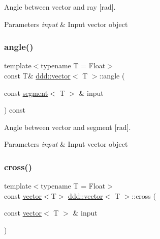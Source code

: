 Angle between vector and ray \mbox{[}rad\mbox{]}. 


\begin{DoxyParams}{Parameters}
{\em input} & Input vector object \\
\hline
\end{DoxyParams}
\mbox{\label{classddd_1_1vector_aa1d50d563f55d5795d565ed70ec5b845}} 
\subsubsection{\texorpdfstring{angle()}{angle()}\hspace{0.1cm}{\footnotesize\ttfamily [4/4]}}
{\footnotesize\ttfamily template$<$typename T = Float$>$ \\
const T\& \hyperlink{classddd_1_1vector}{ddd\+::vector}$<$ T $>$\+::angle (\begin{DoxyParamCaption}\item[{const \hyperlink{classddd_1_1segment}{segment}$<$ T $>$ \&}]{input }\end{DoxyParamCaption}) const\hspace{0.3cm}{\ttfamily [inline]}}



Angle between vector and segment \mbox{[}rad\mbox{]}. 


\begin{DoxyParams}{Parameters}
{\em input} & Input vector object \\
\hline
\end{DoxyParams}
\mbox{\label{classddd_1_1vector_a27ac4cb7a469642d497cfe070935ab4b}} 
\subsubsection{\texorpdfstring{cross()}{cross()}}
{\footnotesize\ttfamily template$<$typename T = Float$>$ \\
const \hyperlink{classddd_1_1vector}{vector}$<$T$>$ \hyperlink{classddd_1_1vector}{ddd\+::vector}$<$ T $>$\+::cross (\begin{DoxyParamCaption}\item[{const \hyperlink{classddd_1_1vector}{vector}$<$ T $>$ \&}]{input }\end{DoxyParamCaption})\hspace{0.3cm}{\ttfamily [inline]}}



